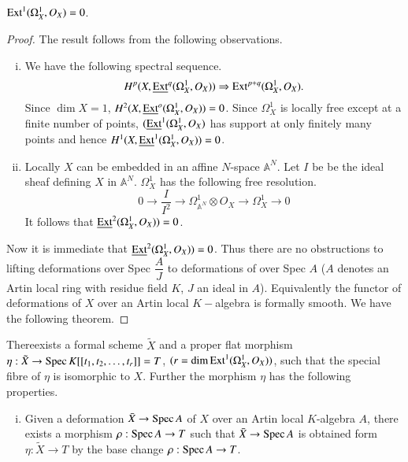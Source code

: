 {\setcounter{sublemma}{-1}
\setcounter{subsection}{2}
\begin{sublemma} %
 $ \operatorname{Ext}^1 ( \Omega^1_X, O_X)  = 0$.
\end{sublemma}

\begin{proof}
The result follows from the following observations. 
\begin{enumerate}[i)]
\item We have  the following spectral sequence.
$$
H^p (X, \underline{\operatorname{Ext}}^q (\Omega^1_X, O_X)) \Rightarrow \operatorname{Ext}^{p+q}
(\Omega^1_X, O_X). 
$$
Since $\dim X = 1$,  $H^2(X, \underline{\operatorname{Ext}}^o (\Omega^1_X, O_X)) = 0$.
Since $\Omega^1_X $ is locally free except at a finite number of
points, $(\underline{\operatorname{Ext}}^1(\Omega^1_X, O_X)$  has support at only
finitely many points and hence $ H^1 (X, \underline{\operatorname{Ext}}^1 (\Omega^1_X,
O_X)) = 0$. 

\item Locally $X$ can be embedded in an affine $N$-space
  $\mathbb{A}^N$. Let $I$ be be the ideal sheaf defining $X$ in
  $\mathbb{A}^N$. $\Omega^1_X$ has the following free resolution. 
$$
0 \rightarrow \frac{I}{I^2} \rightarrow \Omega^1_{\mathbb{A}^N}
\otimes O_X \rightarrow \Omega^1_X \rightarrow 0 
$$
It follows  that $ \underline{\operatorname{Ext}}^2 (\Omega^1_X, O_X)) = 0 $.
\end{enumerate}

\noindent
Now it is immediate that  $\underline{\operatorname{Ext}}^2 (\Omega^1_X, O_X)) = 0
$. Thus there are no obstructions  to lifting deformations  over Spec
$ \dfrac{A}{J} $ to deformations of over Spec $A$ ($A$ denotes an
Artin local ring with residue field  $K$, $J$ an ideal in
$A$). Equivalently the functor of deformations of $X$ over an Artin
local $K-$algebra is formally smooth. We have the following theorem. 
\end{proof}

\setcounter{subtheorem}{0}
\begin{subtheorem}\label{chap0:subthm0.2.1} %
There\pageoriginale  exists a formal scheme  $\tilde{X}$ and a proper
flat morphism 
$\eta: \tilde{X} \rightarrow \operatorname{Spec} K[[ t_1,t_2,\ldots,t_r]]= T$,
$( r = \dim  \operatorname{Ext}^1 (\Omega^1_{X}, O_X))$, such that the special fibre
of $\eta$ is  isomorphic to $X$. Further the morphism $\eta$ has the
following properties. 
\begin{enumerate}[i)]
\item  Given a deformation $\bar{X} \rightarrow \operatorname{Spec} A $ of $X$  over
  an Artin local $K$-algebra $A$, there exists a morphism  $\rho :
  \operatorname{Spec} A \rightarrow T $ such that  $ \bar{X} \rightarrow \operatorname{Spec} A $
  is obtained form  $\eta : \tilde{X} \rightarrow T $ by the  base
  change $\rho : \operatorname{Spec} A \rightarrow T $. 


\end{enumerate}
\end{subtheorem}}
